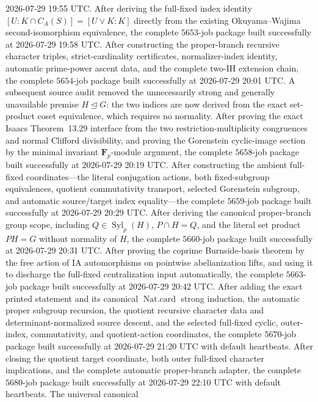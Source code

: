 \documentclass[11pt]{article}
\begin{document}
2026-07-29 19:55 UTC.
After deriving the full-fixed index identity
\([U:K\cap C_A(S)]=[U\vee K:K]\) directly from the existing
Okuyama--Wajima second-isomorphism equivalence, the complete
\(5653\)-job package built successfully at 2026-07-29 19:58 UTC.
After constructing the proper-branch recursive character triples,
strict-cardinality certificates, normalizer-index identity, automatic
prime-power ascent data, and the complete two-IH extension chain, the
complete \(5654\)-job package built successfully at
2026-07-29 20:01 UTC.  A subsequent source audit removed the unnecessarily
strong and generally unavailable premise \(H\trianglelefteq G\): the two
indices are now derived from the exact set-product coset equivalence,
which requires no normality.
After proving the exact Isaacs Theorem~13.29 interface from the two
restriction-multiplicity congruences and normal Clifford divisibility,
and proving the Gorenstein cyclic-image section by the minimal invariant
\(\mathbf F_p\)-module argument, the complete \(5658\)-job package built
successfully at 2026-07-29 20:19 UTC.
After constructing the ambient full-fixed coordinates---the literal
conjugation actions, both fixed-subgroup equivalences, quotient
commutativity transport, selected Gorenstein subgroup, and automatic
source/target index equality---the complete \(5659\)-job package built
successfully at 2026-07-29 20:29 UTC.
After deriving the canonical proper-branch group scope, including
\(Q\in\operatorname{Syl}_p(H)\), \(P\cap H=Q\), and the literal set
product \(PH=G\) without normality of \(H\), the complete \(5660\)-job
package built successfully at 2026-07-29 20:31 UTC.
After proving the coprime Burnside-basis theorem by the free action of IA
automorphisms on pointwise abelianization lifts, and using it to discharge
the full-fixed centralization input automatically, the complete
\(5663\)-job package built successfully at 2026-07-29 20:42 UTC.
After adding the exact printed statement and its canonical
\(\operatorname{Nat.card}\) strong induction, the automatic proper
subgroup recursion, the quotient recursive character data and
determinant-normalized source descent, and the selected full-fixed cyclic,
outer-index, commutativity, and quotient-action coordinates, the complete
\(5670\)-job package built successfully at 2026-07-29 21:20 UTC with
default heartbeats.
After closing the quotient target coordinate, both outer full-fixed
character implications, and the complete automatic proper-branch adapter,
the complete \(5680\)-job package built successfully at
2026-07-29 22:10 UTC with default heartbeats.  The universal canonical
\end{document}
